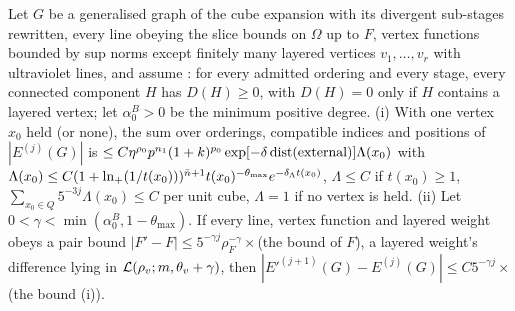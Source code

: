 \begin{theorem}\label{thm:a02:OFB}
Let $G$ be a generalised graph of the cube expansion with its divergent sub-stages rewritten, every line obeying the slice bounds on $\Omega$ up to $F$, vertex functions bounded by sup norms except finitely many layered vertices $v_1,\dots,v_r$ with ultraviolet lines, and assume \DEGB: for every admitted ordering and every stage, every connected component $H$ has $D(H)\ge0$, with $D(H)=0$ only if $H$ contains a layered vertex; let $\alpha_0^B>0$ be the minimum positive degree. (i) With one vertex $x_0$ held (or none), the sum over orderings, compatible indices and positions of $|E^{(j)}(G)|$ is $\le C\eta^{\rho_0}p^{n_1}(1+k)^{p_0}\exp[-\delta\operatorname{dist}(\text{external})]\Lambda(x_0)$ with $\Lambda(x_0)\le C(1+\ln_+(1/t(x_0)))^{\bar n+1}t(x_0)^{-\theta_{\max}}e^{-\delta_\Lambda t(x_0)}$, $\Lambda\le C$ if $t(x_0)\ge1$, $\sum_{x_0\in Q}5^{-3j}\Lambda(x_0)\le C$ per unit cube, $\Lambda=1$ if no vertex is held. (ii) Let $0<\gamma<\min(\alpha_0^B,1-\theta_{\max})$. If every line, vertex function and layered weight obeys a pair bound $|F'-F|\le5^{-\gamma j}\rho_F^{-\gamma}\times$(the bound of $F$), a layered weight's difference lying in $\mathcal L(\rho_v;m,\theta_v+\gamma)$, then $|E'^{(j+1)}(G)-E^{(j)}(G)|\le C5^{-\gamma j}\times$(the bound (i)).
\end{theorem}
